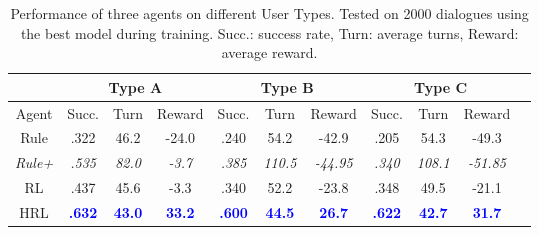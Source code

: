 \documentclass[11pt,letterpaper]{article}
\begin{document}

\begin{table*}[htbp]
\bigskip
\begin{center}
\begin{tabular}{ccccccccccc}
\Xhline{2\arrayrulewidth}
\multirow{2}{0.1cm}{} & \multicolumn{3}{c}{Type A} & \multicolumn{3}{c}{Type B} & \multicolumn{3}{c}{Type C} \\ \hline
Agent & Succ. & Turn & Reward & Succ. & Turn & Reward & Succ. & Turn & Reward\\ \hline \hline
Rule & .322 & 46.2 & -24.0 & .240 & 54.2 & -42.9 & .205 & 54.3 & -49.3 \\ 
\textit{Rule+} & \textit{.535} & \textit{82.0} & \textit{-3.7} & \textit{.385} & \textit{110.5} & \textit{-44.95} & \textit{.340} & \textit{108.1} & \textit{-51.85} \\
RL & .437 & 45.6 & -3.3 & .340 & 52.2 & -23.8 & .348 & 49.5 & -21.1 \\
HRL & \textbf{\textcolor{blue}{.632}} & \textbf{\textcolor{blue}{43.0}} & \textbf{\textcolor{blue}{33.2}} & \textbf{\textcolor{blue}{.600}} & \textbf{\textcolor{blue}{44.5}} & \textbf{\textcolor{blue}{26.7}} & \textbf{\textcolor{blue}{.622}} & \textbf{\textcolor{blue}{42.7}} & \textbf{\textcolor{blue}{31.7}} \\
\hline
\end{tabular}
\end{center}
\vspace{-2mm}
\caption{Performance of three agents on different User Types. Tested on 2000 dialogues using the best model during training. Succ.: success rate, Turn: average turns, Reward: average reward. %
}
\vspace{-3mm}
\label{tab:results}
\end{table*}
\end{document}
